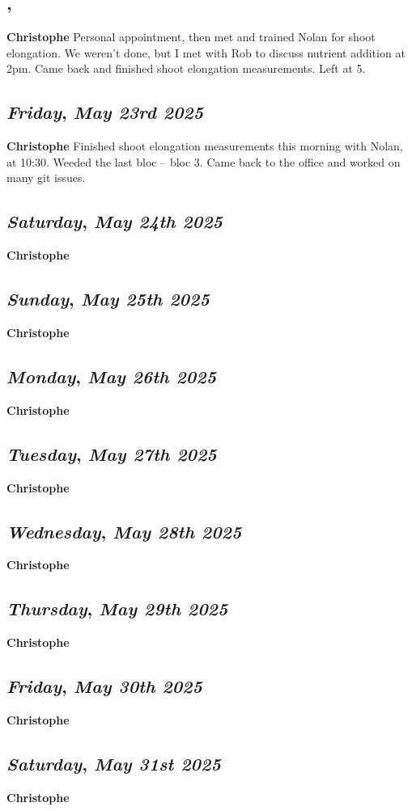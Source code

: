 \subsection*{\weekday, \day}
\textbf {Christophe}
Personal appointment, then met and trained Nolan for shoot elongation. We weren't done, but I met with Rob to discuss nutrient addition at 2pm. Came back and finished shoot elongation measurements. Left at 5.

\def\day{\textit{May 23rd 2025}}
\def\weekday{\textit{Friday}}
\subsection*{\weekday, \day}
\textbf {Christophe}
Finished shoot elongation measurements this morning with Nolan, at 10:30. Weeded the last bloc -- bloc 3. Came back to the office and worked on many git issues. 
\def\day{\textit{May 24th 2025}}
\def\weekday{\textit{Saturday}}
\subsection*{\weekday, \day}
\textbf {Christophe}

\def\day{\textit{May 25th 2025}}
\def\weekday{\textit{Sunday}}
\subsection*{\weekday, \day}
\textbf {Christophe}

\def\day{\textit{May 26th 2025}}
\def\weekday{\textit{Monday}}
\subsection*{\weekday, \day}
\textbf {Christophe}

\def\day{\textit{May 27th 2025}}
\def\weekday{\textit{Tuesday}}
\subsection*{\weekday, \day}
\textbf {Christophe}

\def\day{\textit{May 28th 2025}}
\def\weekday{\textit{Wednesday}}
\subsection*{\weekday, \day}
\textbf {Christophe}

\def\day{\textit{May 29th 2025}}
\def\weekday{\textit{Thursday}}
\subsection*{\weekday, \day}
\textbf {Christophe}

\def\day{\textit{May 30th 2025}}
\def\weekday{\textit{Friday}}
\subsection*{\weekday, \day}
\textbf {Christophe}

\def\day{\textit{May 31st 2025}}
\def\weekday{\textit{Saturday}}
\subsection*{\weekday, \day}
\textbf {Christophe}
